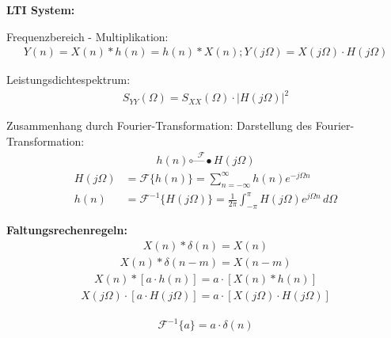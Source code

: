 



\textbf{LTI System:}


Frequenzbereich - Multiplikation:
\begin{align}
Y(n) = X(n) * h(n) = h(n) * X(n); Y(j\Omega) = X(j\Omega) \cdot H(j\Omega)
\end{align}

Leistungsdichtespektrum:
\begin{align}
S_{YY}(\Omega) = S_{XX}(\Omega) \cdot |H(j\Omega)|^2
\end{align}

Zusammenhang durch Fourier-Transformation:
Darstellung des Fourier-Transformation:
\begin{align}
h(n) \overset{\mathcal{F}}{\circ\mbox{---}\bullet} H(j\Omega)
\end{align}
\begin{align}
H(j\Omega) &= \mathcal{F}\{h(n)\} = \sum_{n=-\infty}^{\infty} h(n) e^{-j\Omega n} \\
h(n) &= \mathcal{F}^{-1}\{H(j\Omega)\} = \frac{1}{2\pi} \int_{-\pi}^{\pi} H(j\Omega) e^{j\Omega n} \, d\Omega
\end{align}


\textbf{Faltungsrechenregeln:}
\begin{align}
X(n) * \delta(n) = X(n)
\end{align}
\begin{align}
X(n) * \delta(n-m) = X(n-m)
\end{align}
\begin{align}
X(n) * [a \cdot h(n)] = a \cdot [X(n) * h(n)]
\end{align}
\begin{align}
X(j\Omega) \cdot [a \cdot H(j\Omega)] = a \cdot [X(j\Omega) \cdot H(j\Omega)]
\end{align}

\begin{align}
\mathcal{F}^{-1}\{a\} = a \cdot \delta(n)
\end{align}
